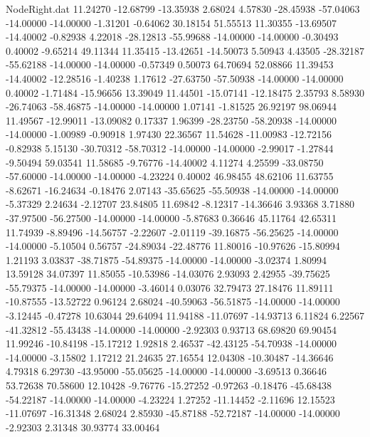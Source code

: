\begin{filecontents}{NodeRight.dat}
  11.24270  -12.68799  -13.35938     2.68024    4.57830  -28.45938  -57.04063  -14.00000  -14.00000   -1.31201   -0.64062   30.18154   51.55513
  11.30355  -13.69507  -14.40002    -0.82938    4.22018  -28.12813  -55.99688  -14.00000  -14.00000   -0.30493    0.40002   -9.65214   49.11344
  11.35415  -13.42651  -14.50073     5.50943    4.43505  -28.32187  -55.62188  -14.00000  -14.00000   -0.57349    0.50073   64.70694   52.08866
  11.39453  -14.40002  -12.28516    -1.40238    1.17612  -27.63750  -57.50938  -14.00000  -14.00000    0.40002   -1.71484  -15.96656   13.39049
  11.44501  -15.07141  -12.18475     2.35793    8.58930  -26.74063  -58.46875  -14.00000  -14.00000    1.07141   -1.81525   26.92197   98.06944
  11.49567  -12.99011  -13.09082     0.17337    1.96399  -28.23750  -58.20938  -14.00000  -14.00000   -1.00989   -0.90918    1.97430   22.36567
  11.54628  -11.00983  -12.72156    -0.82938    5.15130  -30.70312  -58.70312  -14.00000  -14.00000   -2.99017   -1.27844   -9.50494   59.03541
  11.58685   -9.76776  -14.40002     4.11274    4.25599  -33.08750  -57.60000  -14.00000  -14.00000   -4.23224    0.40002   46.98455   48.62106
  11.63755   -8.62671  -16.24634    -0.18476    2.07143  -35.65625  -55.50938  -14.00000  -14.00000   -5.37329    2.24634   -2.12707   23.84805
  11.69842   -8.12317  -14.36646     3.93368    3.71880  -37.97500  -56.27500  -14.00000  -14.00000   -5.87683    0.36646   45.11764   42.65311
  11.74939   -8.89496  -14.56757    -2.22607   -2.01119  -39.16875  -56.25625  -14.00000  -14.00000   -5.10504    0.56757  -24.89034  -22.48776
  11.80016  -10.97626  -15.80994     1.21193    3.03837  -38.71875  -54.89375  -14.00000  -14.00000   -3.02374    1.80994   13.59128   34.07397
  11.85055  -10.53986  -14.03076     2.93093    2.42955  -39.75625  -55.79375  -14.00000  -14.00000   -3.46014    0.03076   32.79473   27.18476
  11.89111  -10.87555  -13.52722     0.96124    2.68024  -40.59063  -56.51875  -14.00000  -14.00000   -3.12445   -0.47278   10.63044   29.64094
  11.94188  -11.07697  -14.93713     6.11824    6.22567  -41.32812  -55.43438  -14.00000  -14.00000   -2.92303    0.93713   68.69820   69.90454
  11.99246  -10.84198  -15.17212     1.92818    2.46537  -42.43125  -54.70938  -14.00000  -14.00000   -3.15802    1.17212   21.24635   27.16554
  12.04308  -10.30487  -14.36646     4.79318    6.29730  -43.95000  -55.05625  -14.00000  -14.00000   -3.69513    0.36646   53.72638   70.58600
  12.10428   -9.76776  -15.27252    -0.97263   -0.18476  -45.68438  -54.22187  -14.00000  -14.00000   -4.23224    1.27252  -11.14452   -2.11696
  12.15523  -11.07697  -16.31348     2.68024    2.85930  -45.87188  -52.72187  -14.00000  -14.00000   -2.92303    2.31348   30.93774   33.00464

\end{filecontents}
